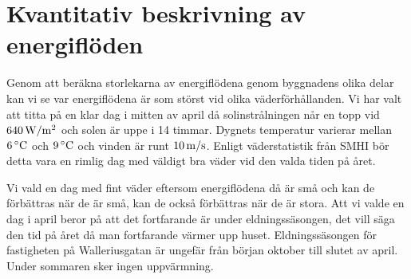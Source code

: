 \section{Kvantitativ beskrivning av energiflöden}

Genom att beräkna storlekarna av energiflödena genom byggnadens olika delar kan vi se var energiflödena är som störst vid olika väderförhållanden. Vi har valt att titta på en klar dag i mitten av april då solinstrålningen når en topp vid $\unit[640]{W/m^2}$ och solen är uppe i 14 timmar. Dygnets temperatur varierar mellan $\unit[6]{^\circ C}$ och $\unit[9]{^\circ C}$ och vinden är runt $\unit[10]{m/s}$. Enligt väderstatistik från SMHI\cite{SMHIdata} bör detta vara en rimlig dag med väldigt bra väder vid den valda tiden på året.

Vi vald en dag med fint väder eftersom energiflödena då är små och kan de förbättras när de är små, kan de också förbättras när de är stora. Att vi valde en dag i april beror på att det fortfarande är under eldningssäsongen, det vill säga den tid på året då man fortfarande värmer upp huset. Eldningssäsongen för fastigheten på Walleriusgatan är ungefär från början oktober till slutet av april. Under sommaren sker ingen uppvärmning.








